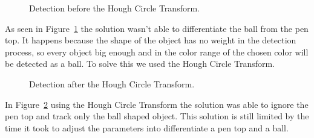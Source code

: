 \documentclass[10pt,twocolumn,letterpaper]{article}
\begin{document}
\begin{figure}[!h]
\centering
\setlength{\fboxsep}{1pt}
\setlength{\fboxrule}{1pt}
\caption{Detection before the Hough Circle Transform.}\label{fig:not_hough}
\end{figure}

As seen in Figure~\ref{fig:not_hough} the solution wasn't able to
differentiate the ball from the pen top. It happens because the shape of the
object has no weight in the detection process, so every object big enough and
in the color range of the chosen color will be detected as a ball. To solve
this we used the Hough Circle Transform.

\begin{figure}[!h]
\centering
\setlength{\fboxsep}{1pt}
\setlength{\fboxrule}{1pt}
\caption{Detection after the Hough Circle Transform.}\label{fig:yes_hough}
\end{figure}

In Figure~\ref{fig:yes_hough} using the Hough Circle Transform the solution
was able to ignore the pen top and track only the ball shaped object. This
solution is still limited by the time it took to adjust the parameters into
differentiate a pen top and a ball.
\end{document}
